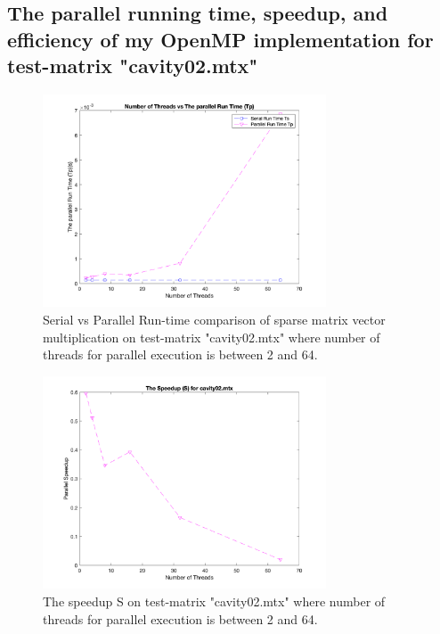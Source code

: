 \documentclass[a4paper,11pt]{article}
\theoremstyle{mytheor}
\begin{document}
\FloatBarrier
\subsection{The parallel running time, speedup, and efficiency of my OpenMP implementation for test-matrix "cavity02.mtx"}

\begin{figure}[!htb]
    \centering
    \includegraphics[width=0.75\textwidth]{f3}
    \caption{Serial vs Parallel Run-time comparison of sparse matrix vector multiplication on test-matrix "cavity02.mtx" where number of threads for parallel execution is between 2 and 64.}
\end{figure}

\begin{figure}[!htb]
    \centering
    \includegraphics[width=0.75\textwidth]{s3}
    \caption{The speedup S on test-matrix "cavity02.mtx" where number of threads for parallel execution is between 2 and 64.}
\end{figure}
\end{document}
